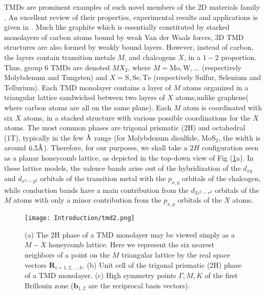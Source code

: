\acl{TMD}s are prominent examples of such novel members of the \ac{2D} materials family \cite{wang_electronics_2012, roldan_electronic_2014, xu_spin_2014}.
An excellent review of their properties, experimental results and applications is given in \cite{manzeli_2d_2017}.
Much like graphite which is essentially constituted by stacked monolayers of carbon atoms bound by weak Van der Waals forces, 3D \ac{TMD} structures are also formed by weakly bound layers.
However, instead of carbon, the layers contain transition metals $M$, and chalcogens $X$, in a $1-2$ proportion.
Thus, group 6 \acp{TMD} are denoted $MX_2$, where $M = \text{Mo}, \text{W}, ...$ (respectively Molybdenum and Tungsten) and $X = \text{S}, \text{Se}, \text{Te}$ (respectively Sulfur, Selenium and Tellurium).
Each \acs{TMD} monolayer contains a layer of $M$ atoms organized in a triangular lattice sandwiched between two layers of $X$ atoms,unlike graphene( where carbon atoms are all on the same plane).
Each $M$ atom is coordinated with six $X$ atoms, in a stacked structure with various possible coordinations for the $X$ atoms.
The most common phases are trigonal prismatic (2H) and octahedral (1T), typically in the few $\textup{\AA}$ range (for Molybdenum disulfide, $\text{Mo}\text{S}_2$, the width is around $6.5 \textup{\AA}$).
Therefore, for our purposes, we shall take a $2H$ configuration seen as a planar honeycomb lattice, as depicted in the top-down view of Fig (\ref{fig:tmdHex}a).
In these lattice models, the valence bands arise out of the hybridization of the $d_{xy}$ and $d_{x^2 - y^2}$ orbitals of the transition metal with the $p_{x, y}$ orbitals of the chalcogen, while conduction bands have a main contribution from the $d_{3z^2 - r^2}$ orbitals of the $M$ atoms with only a minor contribution from the $p_{x, y}$ orbitals of the $X$ atoms.
\begin{figure}[H]
\centering
\texttt{[image: Introduction/tmd2.png]}
 \caption[\ac{TMD} monolayer condensing in its 2H phase.
 $M-X$ honeycomb lattice.
 Unit cell of the trigonal prismatic (2H) phase of a \ac{TMD} monolayer.
 High symmetry points of the corresponding hexagonal lattice's  reciprocal space.]{(a) The 2H phase of a  \ac{TMD} monolayer may be viewed simply as a $M-X$ honeycomb lattice. Here we represent the six nearest neighbors of a point on the $M$ triangular lattice by the real space vectors $\bm R_{i = 1,2,..., 6}$.
(b) Unit cell of the trigonal prismatic (2H) phase of a \ac{TMD} monolayer.
(c) High symmetry points $\Gamma, M, K$ of the first Brillouin zone ($\bm b_{1,2}$ are the reciprocal basis vectors).\label{fig:tmdHex}}
\end{figure}

